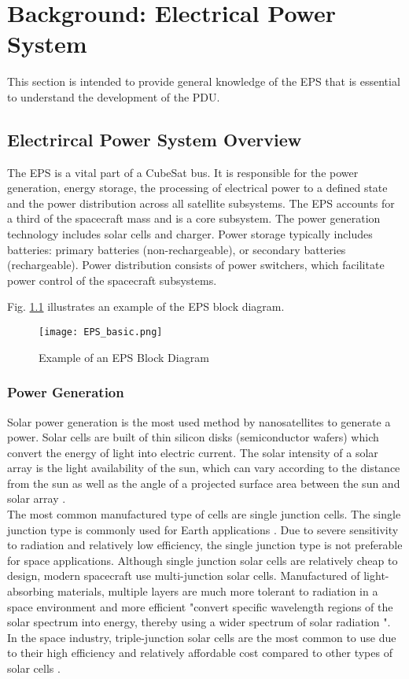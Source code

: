 \chapter{Background: Electrical Power System  \label{cha:chapter2}}
This section is intended to provide general knowledge of the EPS that is essential to understand the development of the PDU. 
 

\section{Electrircal Power System Overview \label{sec:tech}}
The EPS is a vital part of a CubeSat bus. It is responsible for the power generation, energy storage, the processing of electrical power to a defined state and the power distribution across all satellite subsystems. The EPS accounts for a third of the spacecraft mass and is a core subsystem. The power generation technology includes solar cells and charger. Power storage typically includes batteries: primary batteries (non-rechargeable), or secondary batteries (rechargeable). Power distribution consists of power switchers, which facilitate power control of the spacecraft subsystems.

Fig. \ref{fig: EPSS} illustrates an example of the EPS block diagram.



	\begin{figure}[h]
		\centering
		\texttt{[image: EPS\_basic.png]}
			\caption{Example of an EPS Block Diagram}
			\label{fig: EPSS}
	\end{figure}

\subsection{Power Generation \label{sec:tech00}}



 Solar power generation is the most used method by nanosatellites to generate a power. Solar cells are built of thin silicon disks (semiconductor wafers)  which convert the energy of light into electric current. The solar intensity of a solar array is the light availability of the sun, which can vary according to the distance from the sun as well as the angle of a projected surface area between the sun and solar array \cite{1}.  
\\

The most common manufactured type of cells are single junction cells. The single junction type is commonly used for Earth applications \cite{2}. Due to severe sensitivity to radiation and relatively low efficiency, the single junction type is not preferable for space applications. Although single junction solar cells are relatively cheap to design, modern spacecraft use multi-junction solar cells. Manufactured of light-absorbing materials, multiple layers are much more tolerant to radiation in a space environment and more efficient  \cite{1} "convert specific wavelength regions of the solar spectrum into energy, thereby using a wider spectrum of solar radiation ". 
 In the space industry, triple-junction solar cells are the most common to use due to their high efficiency and relatively affordable cost compared to other types of solar cells \cite{3}.

